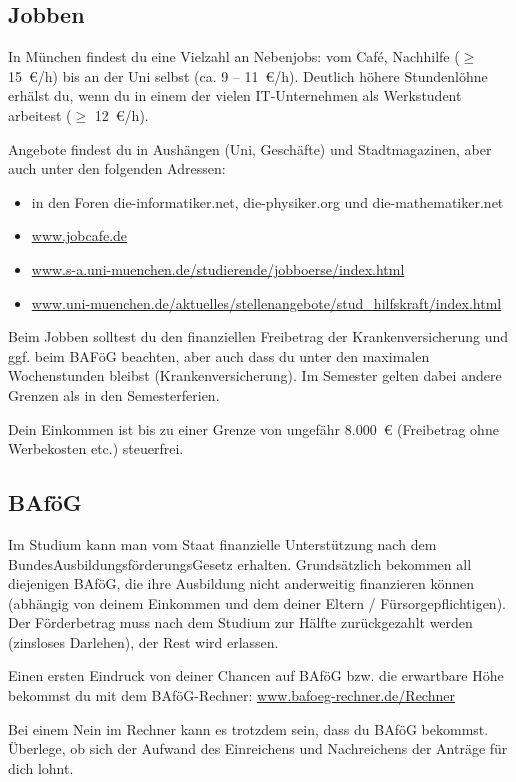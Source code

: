 \documentclass[twoside,12pt,parskip=half-]{scrartcl}
\begin{document}
\subsection{Jobben}
In München findest du eine Vielzahl an Nebenjobs: vom Café, Nachhilfe ($\geq$ 15~€/h) bis an der Uni selbst (ca. 9 -- 11~€/h). Deutlich höhere Stundenlöhne erhälst du, wenn du in einem der vielen IT-Unternehmen als Werkstudent arbeitest ($\geq$ 12~€/h).

Angebote findest du in Aushängen (Uni, Geschäfte) und Stadtmagazinen, aber auch unter den folgenden Adressen:
\begin{itemize}

\item in den Foren die-informatiker.net, die-physiker.org und die-mathematiker.net

\item \url{www.jobcafe.de}

\item \url{www.s-a.uni-muenchen.de/studierende/jobboerse/index.html}

\item \url{www.uni-muenchen.de/aktuelles/stellenangebote/stud_hilfskraft/index.html}
\end{itemize}

Beim Jobben solltest du den finanziellen Freibetrag der Krankenversicherung und ggf. beim BAFöG beachten, aber auch dass du unter den maximalen Wochenstunden bleibst (Krankenversicherung). Im Semester gelten dabei andere Grenzen als in den Semesterferien.

Dein Einkommen ist bis zu einer Grenze von ungefähr 8.000~€ (Freibetrag ohne Werbekosten etc.) steuerfrei.


\subsection{BAföG}
Im Studium kann man vom Staat finanzielle Unterstützung nach dem BundesAusbildungsförderungsGesetz erhalten. Grundsätzlich bekommen all diejenigen BAföG, die ihre Ausbildung nicht anderweitig finanzieren können (abhängig von deinem Einkommen und dem deiner Eltern / Fürsorgepflichtigen). Der Förderbetrag muss nach dem Studium zur Hälfte zurückgezahlt werden (zinsloses Darlehen), der Rest wird erlassen.

Einen ersten Eindruck von deiner Chancen auf BAföG bzw. die erwartbare
Höhe bekommst du mit dem BAföG-Rechner:
\url{www.bafoeg-rechner.de/Rechner}

Bei einem Nein im Rechner kann es trotzdem sein, dass du BAföG
bekommst. Überlege, ob sich der Aufwand des Einreichens und
Nachreichens der Anträge für dich lohnt.
\end{document}
